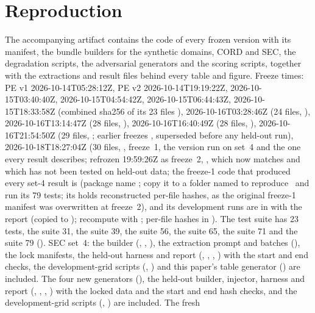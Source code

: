 \section{Reproduction}\label{app:repro}
The accompanying artifact contains the code of every frozen version with its manifest, the bundle builders for the synthetic domains, CORD and SEC, the degradation scripts, the adversarial generators and the scoring scripts, together with the extractions and result files behind every table and figure. Freeze times: PE v1 2026-10-14T05:28:12Z, PE v2 2026-10-14T19:19:22Z, \vq{} 2026-10-15T03:40:40Z,  2026-10-15T04:54:42Z,  2026-10-15T06:44:43Z,  2026-10-15T18:33:58Z (combined sha256 of its 23 files ),  2026-10-16T03:28:46Z (24 files, ),  2026-10-16T13:14:47Z (28 files, ),  2026-10-16T16:40:49Z (28 files, ),  2026-10-16T21:54:50Z (29 files, ; earlier freezes ,  superseded before any held-out run),  2026-10-18T18:27:04Z (30 files, , freeze~1, the version run on set~4 and the one every  result describes; refrozen 19:59:26Z as freeze~2, , which  now matches and which has not been tested on held-out data; the freeze-1 code that produced every set-4 result is  (package name ; copy it to a folder named  to reproduce \ and run its 79 tests; its  holds reconstructed per-file hashes, as the original freeze-1 manifest was overwritten at freeze~2), and its development runs are in  with the report  (copied to ); recompute with ; per-file hashes in ). The  test suite has 23 tests, the  suite 31, the  suite 39, the  suite 56, the  suite 65, the  suite 71 and the  suite 79 (). SEC set~4: the builder (, , ), the extraction prompt and batches (), the lock manifests, the held-out harness and report (, , , ) with the start and end checks, the development-grid scripts (, ) and this paper's table generator () are included. The four new generators (), the  held-out builder, injector, harness and report (, , , ) with the locked data and the start and end hash checks, and the development-grid scripts (, ) are included. The  fresh 